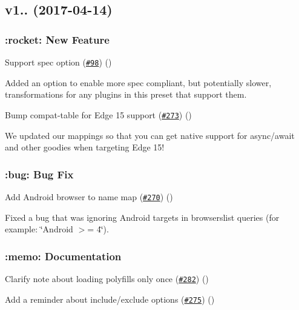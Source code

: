 \subsection*{v1.. (2017-\/04-\/14)}

\subsubsection*{\+:rocket\+: New Feature}


\begin{DoxyItemize}
\item Support {\ttfamily spec} option (\href{https://github.com/babel/babel-preset-env/pull/98}{\tt \#98}) ()
\end{DoxyItemize}

Added an option to enable more spec compliant, but potentially slower, transformations for any plugins in this preset that support them.


\begin{DoxyItemize}
\item Bump compat-\/table for Edge 15 support (\href{https://github.com/babel/babel-preset-env/pull/273}{\tt \#273}) ()
\end{DoxyItemize}

We updated our mappings so that you can get native support for async/await and other goodies when targeting Edge 15!

\subsubsection*{\+:bug\+: Bug Fix}


\begin{DoxyItemize}
\item Add Android browser to name map (\href{https://github.com/babel/babel-preset-env/pull/270}{\tt \#270}) ()
\end{DoxyItemize}

Fixed a bug that was ignoring Android targets in browserslist queries (for example\+: \char`\"{}\+Android $>$= 4\char`\"{}).

\subsubsection*{\+:memo\+: Documentation}


\begin{DoxyItemize}
\item Clarify note about loading polyfills only once (\href{https://github.com/babel/babel-preset-env/pull/282}{\tt \#282}) ()
\item Add a reminder about include/exclude options (\href{https://github.com/babel/babel-preset-env/pull/275}{\tt \#275}) ()
\end{DoxyItemize}

